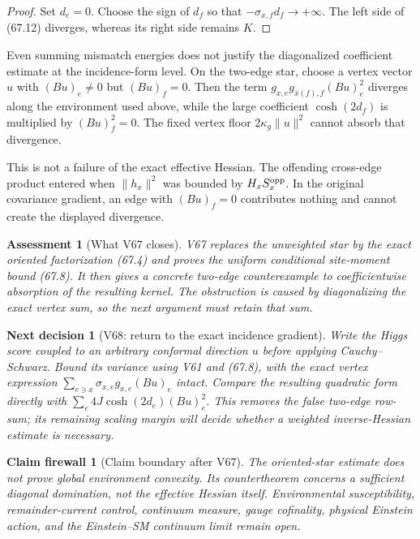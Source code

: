 \documentclass[11pt]{article}
\newtheorem{firewall}[theorem]{Claim firewall}
\newtheorem{decision}[theorem]{Next decision}
\newtheorem{assessment}[theorem]{Assessment}
\theoremstyle{remark}
\begin{document}
\begin{proof}
Set \(d_e=0\).  Choose the sign of \(d_f\) so that
\(-\sigma_{x,f}d_f\to+\infty\).  The left side of (67.12) diverges,
whereas its right side remains \(K\).
\end{proof}

Even summing mismatch energies does not justify the diagonalized
coefficient estimate at the incidence-form level.  On the two-edge
star, choose a vertex vector \(u\) with
\((Bu)_e\neq0\) but \((Bu)_f=0\).  Then the term
\(g_{x,e}g_{\bar x(f),f}(Bu)_e^2\) diverges along the environment used
above, while the large coefficient \(\cosh(2d_f)\) is multiplied by
\((Bu)_f^2=0\).  The fixed vertex floor \(2\kappa_g\|u\|^2\) cannot
absorb that divergence.

This is not a failure of the exact effective Hessian.  The offending
cross-edge product entered when \(\|h_x\|^2\) was bounded by
\(H_xS_x^{\rm opp}\).  In the original covariance gradient, an edge
with \((Bu)_f=0\) contributes nothing and cannot create the displayed
divergence.

\begin{assessment}[What V67 closes]
\label{ass:v17v67-status}
V67 replaces the unweighted star by the exact oriented factorization
(67.4) and proves the uniform conditional site-moment bound (67.8).
It then gives a concrete two-edge counterexample to coefficientwise
absorption of the resulting kernel.  The obstruction is caused by
diagonalizing the exact vertex sum, so the next argument must retain
that sum.
\end{assessment}

\begin{decision}[V68: return to the exact incidence gradient]
\label{dec:v17v67-next}
Write the Higgs score coupled to an arbitrary conformal direction
\(u\) before applying Cauchy--Schwarz.  Bound its variance using V61
and (67.8), with the exact vertex expression
\(\sum_{e\ni x}\sigma_{x,e}g_{x,e}(Bu)_e\) intact.
Compare the resulting quadratic form directly with
\(\sum_e4J\cosh(2d_e)(Bu)_e^2\).  This removes the false two-edge
row-sum; its remaining scaling margin will decide whether a weighted
inverse-Hessian estimate is necessary.
\end{decision}

\begin{firewall}[Claim boundary after V67]
\label{fire:v17v67}
The oriented-star estimate does not prove global environment convexity.
Its countertheorem concerns a sufficient diagonal domination, not the
effective Hessian itself.  Environmental susceptibility,
remainder-current control, continuum measure, gauge cofinality,
physical Einstein action, and the Einstein--SM continuum limit remain
open.
\end{firewall}
\end{document}

